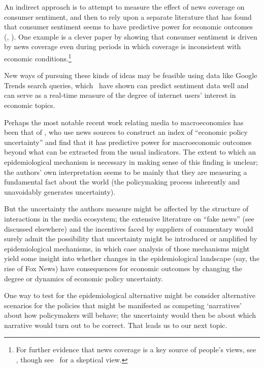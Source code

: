 An indirect approach is to attempt to measure the effect of news coverage on consumer sentiment, and then to rely upon a separate literature that has found that consumer sentiment seems to have predictive power for economic outcomes (\cite{ludvigson2004consumer}, \cite{cfwSentiment}).  One example is a clever paper by \cite{doms2004consumer} showing that consumer sentiment is driven by news coverage even during periods in which coverage is inconsistent with economic conditions.\footnote{For further evidence that news coverage is a key source of people's views, see \cite{lamla2012role}, though see~\cite{pfajfar2013news} for a skeptical view.}

New ways of pursuing these kinds of ideas may be feasible using data like Google Trends search queries, which~\cite{choi2012predicting} have shown can predict sentiment data well and can serve as a real-time measure of the degree of internet users' interest in economic topics.

Perhaps the most notable recent work relating media to macroeconomics has been that of \cite{baker2016measuring}, who use news sources to construct an index of ``economic policy uncertainty'' and find that it has predictive power for macroeconomic outcomes beyond what can be extracted from the usual indicators.  The extent to which an epidemiological mechanism is necessary in making sense of this finding is unclear; the authors' own interpretation seems to be mainly that they are measuring a fundamental fact about the world (the policymaking process inherently and unavoidably generates uncertainty).

But the uncertainty the authors measure might be affected by the structure of interactions in the media ecosystem; the extensive literature on ``fake news'' (see~\cite{allcott2017social} discussed elsewhere) and the incentives faced by suppliers of commentary would surely admit the possibility that uncertainty might be introduced or amplified by epidemiological mechanisms, in which case analysis of those mechanisms might yield some insight into whether changes in the epidemiological landscape (say, the rise of Fox News) have consequences for economic outcomes by changing the degree or dynamics of economic policy uncertainty.

One way to test for the epidemiological alternative might be consider alternative scenarios for the policies that might be manifested as competing `narratives' about how policymakers will behave; the uncertainty would then be about which narrative would turn out to be correct.  That leads us to our next topic.

